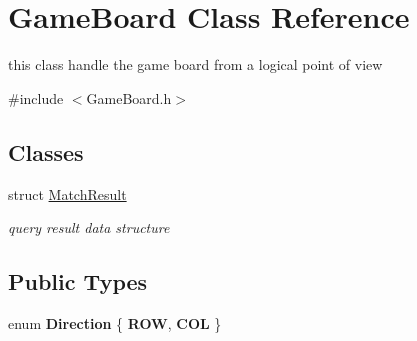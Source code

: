 \hypertarget{class_game_board}{\section{Game\-Board Class Reference}
\label{class_game_board}
}


this class handle the game board from a logical point of view  




{\ttfamily \#include $<$Game\-Board.\-h$>$}

\subsection*{Classes}
\begin{DoxyCompactItemize}
\item 
struct \hyperlink{struct_game_board_1_1_match_result}{Match\-Result}
\begin{DoxyCompactList}\small\item\em query result data structure \end{DoxyCompactList}\end{DoxyCompactItemize}
\subsection*{Public Types}
\begin{DoxyCompactItemize}
\item 
enum {\bfseries Direction} \{ {\bfseries R\-O\-W}, 
{\bfseries C\-O\-L}
 \}
\end{DoxyCompactItemize}
